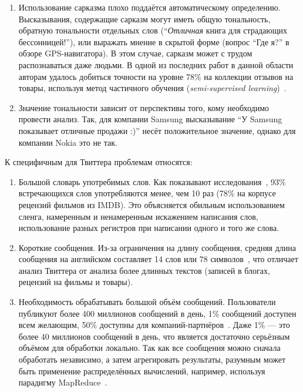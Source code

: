 \begin{enumerate}
\item{
	Использование сарказма плохо поддаётся автоматическому определению. Высказывания, содержащие сарказм могут иметь общую тональность, обратную тональности отдельных слов (``\textit{Отличная} книга для страдающих бессонницей!''), или выражать мнение в скрытой форме (вопрос ``Где я?'' в обзоре GPS-навигатора). В этом случае, сарказм может с трудом распознаваться даже людьми. В одной из последних работ в данной области авторам удалось добиться точности на уровне 78\% на коллекции отзывов на товары, используя метод частичного обучения (\textit{semi-supervised learning})~\cite{sarcasm}.
}

\item{
	Значение тональности зависит от перспективы того, кому необходимо провести анализ. Так, для компании Samsung высказывание ``У Samsung показывает отличные продажи :)'' несёт положительное значение, однако для компании Nokia это не так.
}

\end{enumerate}

\vspace{0.5cm}

К специфичным для Твиттера проблемам относятся:

\begin{enumerate}

\item{
	Большой словарь употребимых слов.  Как показывают исследования~\cite{sparsity}, 93\% встречающихся слов употребляются менее, чем 10 раз (78\% на корпусе рецензий фильмов из IMDB). Это объясняется обильным использованием сленга, намеренным и ненамеренным искажением написания слов, использование разных регистров при написании одного и того же слова.
}

\item{
	Короткие сообщения. Из-за ограничения на длину сообщения, средняя длина сообщения на английском составляет 14 слов или 78 символов~\cite{distsuperv}, что отличает анализ Твиттера от анализа более длинных текстов (записей в блогах, рецензий на фильмы и товары). 
}

\item{
	Необходимость обрабатывать большой объём сообщений. Пользователи публикуют более 400 миллионов сообщений в день, 1\% сообщений доступен всем желающим, 50\% доступны для компаний-партнёров~\cite{streaming}. Даже 1\% --- это более 40 миллионов сообщений в день, что является достаточно серьёзным объёмом для обработки локально. Так как все сообщения можно сначала обработать независимо, а затем агрегировать результаты, разумным может быть применение распределённых вычислений, например, используя парадигму MapReduce~\cite{largescaleml, sentiment_mapreduce}.
}

\end{enumerate}